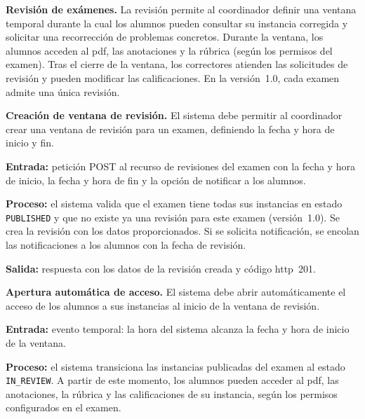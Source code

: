 
\item \textbf{Revisión de exámenes.} \label{rf:review}
La revisión permite al coordinador definir una ventana temporal durante la cual los alumnos
pueden consultar su instancia corregida y solicitar una recorrección de problemas concretos.
Durante la ventana, los alumnos acceden al \acs{pdf}, las anotaciones y la rúbrica (según
los permisos del examen). Tras el cierre de la ventana, los correctores atienden las
solicitudes de revisión y pueden modificar las calificaciones. En la versión~1.0, cada
examen admite una única revisión.

\begin{functional}

    \item \textbf{Creación de ventana de revisión.} \label{rf:review:create}
    El sistema debe permitir al coordinador crear una ventana de revisión para un examen,
    definiendo la fecha y hora de inicio y fin.

    \textbf{Entrada:} petición POST al recurso de revisiones del examen con la fecha y hora
    de inicio, la fecha y hora de fin y la opción de notificar a los alumnos.

    \textbf{Proceso:} el sistema valida que el examen tiene todas sus instancias en estado
    \texttt{PUBLISHED} y que no existe ya una revisión para este examen (versión~1.0). Se
    crea la revisión con los datos proporcionados. Si se solicita notificación, se encolan
    las notificaciones a los alumnos con la fecha de revisión.

    \textbf{Salida:} respuesta con los datos de la revisión creada y código
    \acs{http}~201.

    \item \textbf{Apertura automática de acceso.} \label{rf:review:open}
    El sistema debe abrir automáticamente el acceso de los alumnos a sus instancias al
    inicio de la ventana de revisión.

    \textbf{Entrada:} evento temporal: la hora del sistema alcanza la fecha y hora de inicio
    de la ventana.

    \textbf{Proceso:} el sistema transiciona las instancias publicadas del examen al estado
    \texttt{IN\_REVIEW}. A partir de este momento, los alumnos pueden acceder al \acs{pdf},
    las anotaciones, la rúbrica y las calificaciones de su instancia, según los permisos
    configurados en el examen.


\end{functional}

